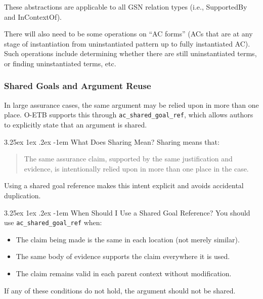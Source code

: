 \documentclass[12pt,twoside,a4paper]{article}
\makeatletter
\renewcommand\paragraph{\@startsection{paragraph}{5}{\z@}%
  {3.25ex \@plus1ex \@minus.2ex}%
  {-1em}%
  {\normalfont\normalsize\bfseries}}
\makeatother
\begin{document}
These abstractions are applicable to all GSN relation types (i.e., SupportedBy and InContextOf).

There will also need to be some operations on ``AC forms'' (ACs that are at any stage of instantiation from uninstantiated pattern up to fully instantiated AC). Such operations include determining whether there are still uninstantiated terms, or finding uninstantiated terms, etc.

\subsubsection{Shared Goals and Argument Reuse}

In large assurance cases, the same argument may be relied upon in more than one place. O-ETB supports this through \texttt{ac\_shared\_goal\_ref}, which allows authors to explicitly state that an argument is shared.

\paragraph{What Does Sharing Mean?}
Sharing means that:
\begin{quote}
The same assurance claim, supported by the same justification and evidence, is intentionally relied upon in more than one place in the case.
\end{quote}

Using a shared goal reference makes this intent explicit and avoids accidental duplication.

\paragraph{When Should I Use a Shared Goal Reference?}
You should use \texttt{ac\_shared\_goal\_ref} when:
\begin{itemize}
\item The claim being made is the same in each location (not merely similar).
\item The same body of evidence supports the claim everywhere it is used.
\item The claim remains valid in each parent context without modification.
\end{itemize}

If any of these conditions do not hold, the argument should not be shared.
\end{document}
